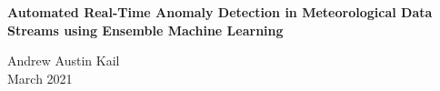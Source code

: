 
\thispagestyle{empty}
\begin{center}
\singlespacing
\Huge
\textbf{Automated Real-Time Anomaly Detection in Meteorological Data Streams using Ensemble Machine Learning}
\end{center}

\vspace*{\fill}
\bigskip
\bigskip

\begin{center}
 Andrew Austin Kail \\
 March 2021
\end{center}

\vspace*{\fill}


